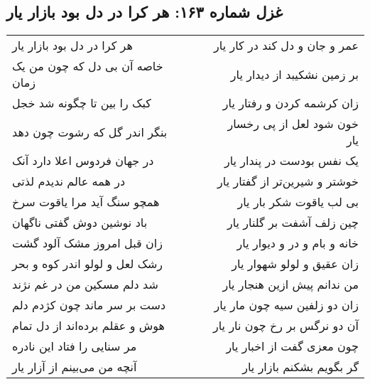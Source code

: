 \begin{center}
\section*{غزل شماره ۱۶۳: هر کرا در دل بود بازار یار}
\label{sec:163}
\begin{longtable}{l p{0.5cm} r}
هر کرا در دل بود بازار یار
&&
عمر و جان و دل کند در کار یار
\\
خاصه آن بی دل که چون من یک زمان
&&
بر زمین نشکیبد از دیدار یار
\\
کبک را بین تا چگونه شد خجل
&&
زان کرشمه کردن و رفتار یار
\\
بنگر اندر گل که رشوت چون دهد
&&
خون شود لعل از پی رخسار یار
\\
در جهان فردوس اعلا دارد آنک
&&
یک نفس بودست در پندار یار
\\
در همه عالم ندیدم لذتی
&&
خوشتر و شیرین‌تر از گفتار یار
\\
همچو سنگ آید مرا یاقوت سرخ
&&
بی لب یاقوت شکر بار یار
\\
باد نوشین دوش گفتی ناگهان
&&
چین زلف آشفت بر گلنار یار
\\
زان قبل امروز مشک آلود گشت
&&
خانه و بام و در و دیوار یار
\\
رشک لعل و لولو اندر کوه و بحر
&&
زان عقیق و لولو شهوار یار
\\
شد دلم مسکین من در غم نژند
&&
من ندانم پیش ازین هنجار یار
\\
دست بر سر ماند چون کژدم دلم
&&
زان دو زلفین سیه چون مار یار
\\
هوش و عقلم برده‌اند از دل تمام
&&
آن دو نرگس بر رخ چون نار یار
\\
مر سنایی را فتاد این نادره
&&
چون معزی گفت از اخبار یار
\\
آنچه من می‌بینم از آزار یار
&&
گر بگویم بشکنم بازار یار
\\
\end{longtable}
\end{center}
